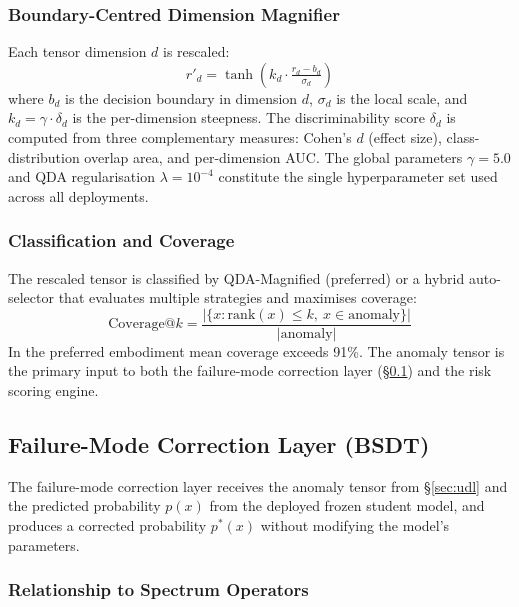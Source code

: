 \documentclass[12pt,a4paper]{article}
\begin{document}
\subsubsection{Boundary-Centred Dimension Magnifier}

Each tensor dimension $d$ is rescaled:
\begin{equation}
r'_d = \tanh\!\left(k_d\cdot\tfrac{r_d-b_d}{\sigma_d}\right)
\end{equation}
where $b_d$ is the decision boundary in dimension $d$, $\sigma_d$ is the
local scale, and $k_d = \gamma\cdot\delta_d$ is the per-dimension
steepness. The discriminability score $\delta_d$ is computed from three
complementary measures: Cohen's $d$ (effect size), class-distribution
overlap area, and per-dimension AUC. The global parameters $\gamma{=}5.0$
and QDA regularisation $\lambda{=}10^{-4}$ constitute the single
hyperparameter set used across all deployments.

\subsubsection{Classification and Coverage}

The rescaled tensor is classified by QDA-Magnified (preferred) or a hybrid
auto-selector that evaluates multiple strategies and maximises coverage:
\begin{equation}
\mathrm{Coverage@}k = \frac{|\{x:\mathrm{rank}(x)\leq k,\
x\in\mathrm{anomaly}\}|}{|\mathrm{anomaly}|}
\end{equation}
In the preferred embodiment mean coverage exceeds 91\%. The anomaly
tensor is the primary input to both the failure-mode correction layer
(\S\ref{sec:bsdt}) and the risk scoring engine.

\subsection{Failure-Mode Correction Layer (BSDT)}
\label{sec:bsdt}

The failure-mode correction layer receives the anomaly tensor from
\S\ref{sec:udl} and the predicted probability $p(x)$ from the deployed
frozen student model, and produces a corrected probability $p^*(x)$
without modifying the model's parameters.

\subsubsection{Relationship to Spectrum Operators}
\end{document}
